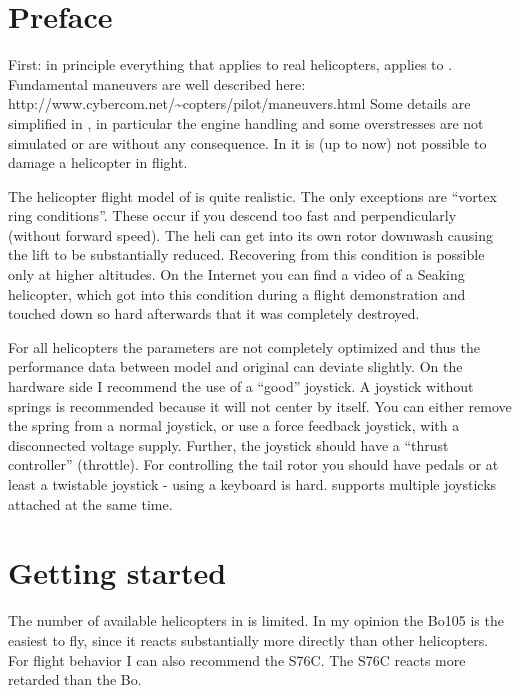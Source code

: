 \section{Preface}
 
First: in principle everything that applies to real helicopters, applies 
to \FlightGear. Fundamental maneuvers are well described here:\\ 
{http://www.cybercom.net/\~{}copters/pilot/maneuvers.html} Some details are 
simplified in \FlightGear, in particular the engine handling and some 
overstresses are not simulated or are without any consequence. 
In \FlightGear{} it is (up to now) not possible to damage a helicopter in 
flight. 


The helicopter flight model of \FlightGear{} is 
quite realistic. The only exceptions are ``vortex ring conditions''. 
These occur if you descend too fast and perpendicularly 
(without forward speed). The heli can get into its own rotor downwash 
causing the lift to be substantially reduced. Recovering from this condition 
is possible only at higher altitudes. On the Internet you can find a video 
of a Seaking helicopter, which got into this condition during a flight 
demonstration and touched down so hard afterwards that it was completely 
destroyed. 

For all \FlightGear{} helicopters the parameters are not completely optimized 
and thus the performance data between model and original can deviate slightly. 
On the hardware side I recommend the use of a ``good'' joystick. A joystick 
without springs is recommended because it will not center by itself. You 
can either remove the spring from a normal joystick, or use a force feedback 
joystick, with a disconnected voltage supply. Further, the joystick should 
have a ``thrust controller'' (throttle). For controlling the tail rotor you 
should have pedals or at least a twistable joystick - using a keyboard is hard.
\FlightGear{} supports multiple joysticks attached at the same time. 

\section{Getting started}

The number of available helicopters in \FlightGear{} is limited. In my opinion 
the Bo105 is the easiest to fly, since it reacts substantially more directly 
than other helicopters. For flight behavior I can also recommend the S76C. 
The S76C reacts more retarded than the Bo. 

